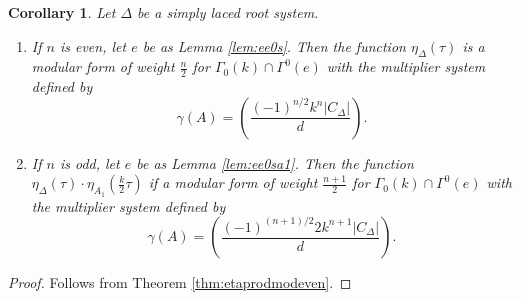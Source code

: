\documentclass{article}
\newtheorem{corollary}[theorem]{Corollary}
\theoremstyle{definition}
\begin{document}
\begin{corollary}  Let $\Delta$ be a simply laced root system. 
	\begin{enumerate}
		\item If $n$ is even, let $e$ be as Lemma \ref{lem:ee0s}. Then the function $\eta_{\Delta}(\tau)$ is a modular form of weight $\frac{n}{2}$ for $\Gamma_0(k)\cap\Gamma^0(e)$ with the multiplier system defined by
		\[ \gamma(A)=\left( \frac{(-1)^{n/2}k^n|C_{\Delta}|}{d} \right). \]
		\item If $n$ is odd, let $e$ be as Lemma \ref{lem:ee0sa1}. Then the function $\eta_{\Delta}(\tau) \cdot \eta_{A_1}(\frac{k}{2}\tau)$ if a modular form of weight $\frac{n+1}{2}$ for $\Gamma_0(k)\cap\Gamma^0(e)$ with the multiplier system defined by
		\[ \gamma(A)=\left( \frac{(-1)^{(n+1)/2}2k^{n+1}|C_{\Delta}|}{d} \right). \]
	\end{enumerate}
	\label{cor:etamultsyscalc}
\end{corollary}
\begin{proof} Follows from Theorem \ref{thm:etaprodmodeven}.
\end{proof}
\end{document}
